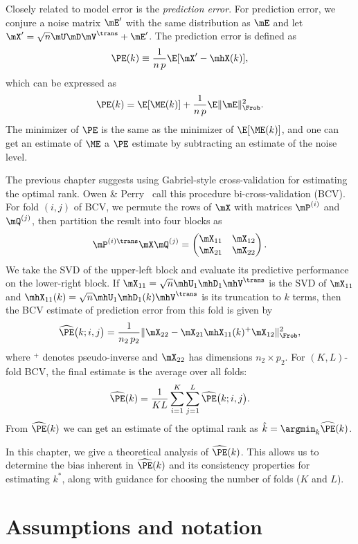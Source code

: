 Closely related to model error is the \emph{prediction error}.  For prediction error, we conjure a noise matrix $\mE'$ with the same distribution as $\mE$ and let $\mX' = \sqrt{n} \mU \mD \mV^\trans + \mE'$.  The prediction error is defined as
\[
    \PE(k) \equiv \frac{1}{n \, p} \E[ \mX' - \mhX(k) ],
\]
which can be expressed as
\[
    \PE(k) = \E[ \ME(k) ] + \frac{1}{n \, p} \E \| \mE \|_\Frob^2.
\]
The minimizer of $\PE$ is the same as the minimizer of $\E[ \ME(k) ]$,
and one can get an estimate of $\ME$ a $\PE$ estimate by subtracting an estimate of the noise level.

The previous chapter suggests using Gabriel-style cross-validation for estimating the optimal rank.  Owen \& Perry~\cite{owen2009bi} call this procedure bi-cross-validation (BCV).  For fold $(i,j)$ of BCV, we permute
the rows of $\mX$ with matrices $\mP^{(i)}$ and $\mQ^{(j)}$, then partition the result into four blocks as
\[
    \mP^{(i)\trans} \mX \mQ^{(j)}
        =
        \left(
        \begin{matrix}
            \mX_{11} & \mX_{12} \\
            \mX_{21} & \mX_{22}
        \end{matrix}
        \right).
\]
We take the SVD of the upper-left block and evaluate its predictive 
performance on the lower-right block.  If 
$\mX_{11} = \sqrt{n} \mhU_1 \mhD_1 \mhV^\trans$ is the SVD of $\mX_{11}$ and
$\mhX_{11}(k) = \sqrt{n} \mhU_1 \mhD_1(k) \mhV^\trans$ is its truncation to 
$k$ terms, then the BCV estimate of prediction error from this fold is given 
by
\[
    \widehat{\PE}\big(k ; i, j \big)
        =
            \frac{1}{n_2 \, p_2}
            \| \mX_{22} - \mX_{21} \mhX_{11}(k)^+ \mX_{12} \|_\Frob^2,
\]
where $^+$ denotes pseudo-inverse and $\mX_{22}$ has dimensions $n_2 \times p_2$.  For $(K,L)$-fold BCV, the final estimate is the average over all folds:
\[
    \widehat{\PE}(k)
        =
        \frac{1}{K L}
        \sum_{i=1}^K
        \sum_{j=1}^L
            \widehat{\PE}\big(k ; i, j \big).
\]
From $\widehat{\PE}(k)$ we can get an estimate of the optimal rank as
$\hat k = \argmin_k \widehat{\PE}(k)$.

In this chapter, we give a theoretical analysis of $\widehat{\PE}(k)$.  This allows us to determine the bias inherent in $\widehat{\PE}(k)$ and its consistency properties for estimating $k^\ast$, along with guidance for choosing the number of folds ($K$ and $L$).


\section{Assumptions and notation}

